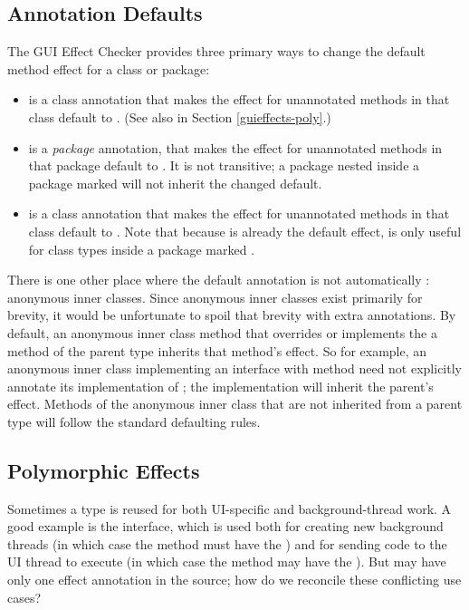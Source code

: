 \subsection{Annotation Defaults\label{guieffects-defaults}}
The GUI Effect Checker provides three primary ways to change the default method effect for a class
or package:
\begin{itemize}
\item {} is a class annotation that makes the effect for unannotated methods in that
class default to
.  (See also  in Section \ref{guieffects-poly}.)
\item {} is a \emph{package} annotation, that makes the effect for unannotated
methods in that package default to .  It is not transitive; a package nested inside
a package marked  will not inherit the changed default.
\item {} is a class annotation that makes the effect for unannotated methods in that
class default to .  Note that because  is already the default
effect,  is only useful for class types inside a package marked .
\end{itemize}

There is one other place where the default annotation is not automatically :
anonymous inner classes.  Since anonymous inner classes exist primarily for brevity, it would be
unfortunate to spoil that brevity with extra annotations.  By default, an anonymous inner class
method that overrides or implements the a method of the parent type inherits that method's effect.
So for example, an anonymous inner class implementing an interface with method  need not explicitly annotate its implementation of ; the implementation will inherit
the parent's effect.  Methods of the anonymous inner class that are not inherited from a parent type
will follow the standard defaulting rules.

\subsection{Polymorphic Effects\label{guieffects-poly}}
Sometimes a type is reused for both UI-specific and background-thread work.  A good example is the
 interface, which is used both for creating new background threads (in which case the
 method must have the ) and for sending code to the UI thread to
execute (in which case the  method may have the ).  But
 may have only one effect annotation in the source; how do we reconcile these
conflicting use cases?


